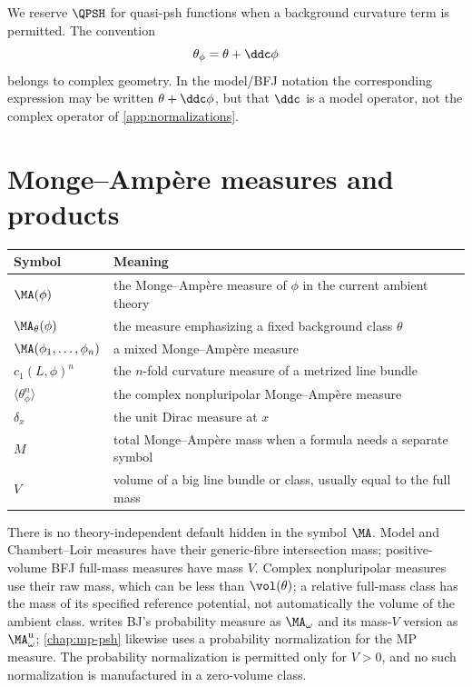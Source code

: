 We reserve \(\QPSH\) for quasi-psh functions when a background curvature
term is permitted.  The convention
\[
 \theta_\phi=\theta+\ddc\phi
\]
belongs to complex geometry.  In the model/BFJ notation the corresponding
expression may be written \(\theta+\ddc\phi\), but that \(\ddc\) is a model
operator, not the complex operator of \cref{app:normalizations}.

\section{Monge--Amp\`ere measures and products}
\label{sec:appK-ma}


\begin{center}
\begin{tabular}{@{}p{}p{}@{}}
\toprule
Symbol & Meaning \\
\midrule
\(\MA(\phi)\)
  & the Monge--Amp\`ere measure of \(\phi\) in the current ambient theory \\
\(\MA_\theta(\phi)\)
  & the measure emphasizing a fixed background class \(\theta\) \\
\(\MA(\phi_1,\ldots,\phi_n)\)
  & a mixed Monge--Amp\`ere measure \\
\(c_1(L,\phi)^n\)
  & the \(n\)-fold curvature measure of a metrized line bundle \\
\(\langle\theta_\phi^n\rangle\)
  & the complex nonpluripolar Monge--Amp\`ere measure \\
\(\delta_x\)
  & the unit Dirac measure at \(x\) \\
\(M\)
  & total Monge--Amp\`ere mass when a formula needs a separate symbol \\
\(V\)
  & volume of a big line bundle or class, usually equal to the full mass \\
\bottomrule
\end{tabular}
\end{center}

There is no theory-independent default hidden in the symbol \(\MA\).
Model and Chambert--Loir measures have their generic-fibre intersection
mass; positive-volume BFJ full-mass measures have mass \(V\). Complex
nonpluripolar measures use their raw mass, which can be less than
\(\vol(\theta)\); a relative full-mass class has the mass of its specified
reference potential, not automatically the volume of the ambient class.
 writes BJ's probability measure as \(\MA_\omega\) and its
mass-\(V\) version as \(\MA^{\mathrm u}_\omega\); \cref{chap:mp-psh} likewise uses
a probability normalization for the MP measure.
The probability normalization is permitted only for \(V>0\), and no such
normalization is manufactured in a zero-volume class.

